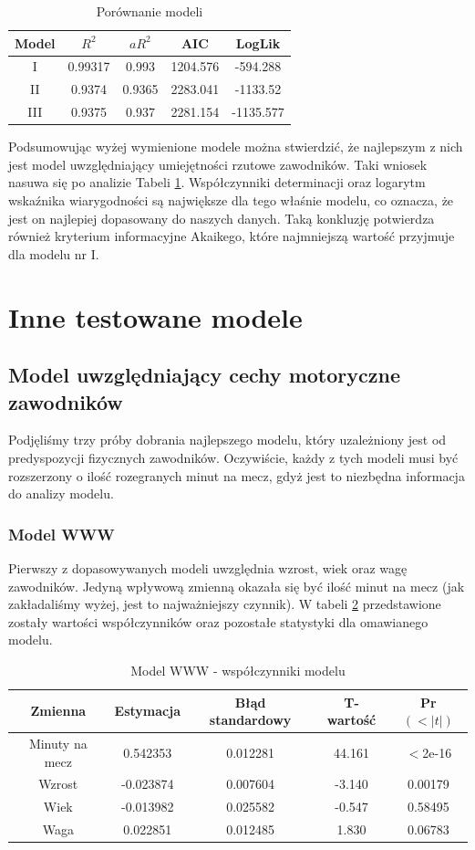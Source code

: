 \documentclass[11pt,a4paper]{article}
\begin{document}
\begin{table}[H]
	\begin{center}
		\begin{tabular}{| c | c | c | c | c |}
			\hline
			Model & $R^2$ & $aR^2$ & AIC & LogLik \\ \hline
			I & 0.99317 & 0.993 & 1204.576 & -594.288\\ \hline
			II & 0.9374 & 0.9365 & 2283.041 & -1133.52\\ \hline 
			III & 0.9375 & 0.937 & 2281.154 & -1135.577\\ \hline  
		\end{tabular}
		\caption{Porównanie modeli}
		\label{porownanie_modeli}
	\end{center}
\end{table}
Podsumowując wyżej wymienione modele można stwierdzić, że najlepszym z nich jest model uwzględniający umiejętności rzutowe zawodników. Taki wniosek nasuwa się po analizie Tabeli \ref{porownanie_modeli}. Współczynniki determinacji oraz logarytm wskaźnika wiarygodności są największe dla tego właśnie modelu, co oznacza, że jest on najlepiej dopasowany do naszych danych. Taką konkluzję potwierdza również kryterium informacyjne Akaikego, które najmniejszą wartość przyjmuje dla modelu nr I.

\section{Inne testowane modele}
\subsection{Model uwzględniający cechy motoryczne zawodników}
Podjęliśmy trzy próby dobrania najlepszego modelu, który uzależniony jest od predyspozycji fizycznych zawodników. Oczywiście, każdy z tych modeli musi być rozszerzony o ilość rozegranych minut na mecz, gdyż jest to niezbędna informacja do analizy modelu.

\subsubsection{Model WWW}
Pierwszy z dopasowywanych modeli uwzględnia wzrost, wiek oraz wagę zawodników. Jedyną wpływową zmienną okazała się być ilość minut na mecz (jak zakładaliśmy wyżej, jest to najważniejszy czynnik). W tabeli \ref{model_www} przedstawione zostały wartości współczynników oraz pozostałe statystyki dla omawianego modelu. 
\begin{table}[H]
	\begin{tabular}{| c | c | c | c | c |}
		\hline
		Zmienna & Estymacja & Błąd standardowy & T-wartość & Pr$(<|t|)$\\ \hline
		Minuty na mecz & 0.542353 & 0.012281 & 44.161 & $<$2e-16\\ \hline
		Wzrost & -0.023874 & 0.007604 & -3.140 & 0.00179\\ \hline
		Wiek & -0.013982 & 0.025582 & -0.547 & 0.58495\\ \hline 
		Waga & 0.022851 & 0.012485 & 1.830 & 0.06783\\ \hline
	\end{tabular}
	\caption{Model WWW - współczynniki modelu}
	\label{model_www}
\end{table}
\end{document}
